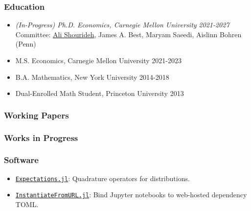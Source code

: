 \documentclass[12pt]{article}   %
\begin{document}
\subsubsection*{Education}
\begin{itemize}
  \item \textit{(In-Progress) Ph.D. Economics, Carnegie Mellon University} \hfill \emph{2021-2027}
  \subitem Committee: \underline{Ali Shourideh}, James A. Best, Maryam Saeedi, Aislinn Bohren (Penn)
  \item M.S. Economics, Carnegie Mellon University \hfill 2021-2023
  \item B.A. Mathematics, New York University \hfill 2014-2018
  \item Dual-Enrolled Math Student, Princeton University \hfill 2013
\end{itemize} 


\subsubsection*{Working Papers}
\begin{refsection} %
\nocite{NBERw28981}
\nocite{FP} 
\hspace*{1.2cm}%
\begin{minipage}{0.9\textwidth}%
  \printbibliography[heading=none, sorting=ynt]
\end{minipage}%
\end{refsection}

\subsubsection*{Works in Progress}
\begin{refsection} %
\nocite{SL}
\hspace*{1.2cm}%
\begin{minipage}{0.9\textwidth}%
  \printbibliography[heading=none, sorting=ynt]
\end{minipage}%
\end{refsection}


\subsubsection*{Software}
\begin{itemize}
  \item \href{https://github.com/QuantEcon/Expectations.jl}{\texttt{Expectations.jl}}: Quadrature operators for distributions.
  \item \href{https://github.com/QuantEcon/InstantiateFromURL.jl}{\texttt{InstantiateFromURL.jl}}: Bind Jupyter notebooks to web-hosted dependency TOML.
\end{itemize}
\end{document}
